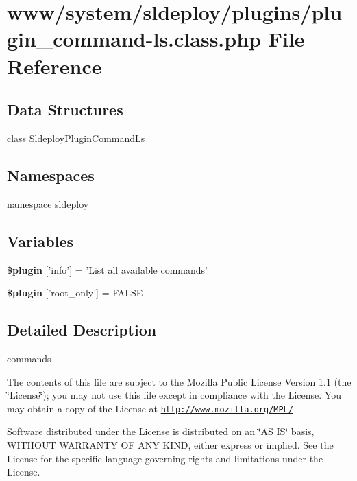 \hypertarget{plugin__command-ls_8class_8php}{
\section{www/system/sldeploy/plugins/plugin\_\-command-\/ls.class.php File Reference}
\label{plugin__command-ls_8class_8php}
}
\subsection*{Data Structures}
\begin{DoxyCompactItemize}
\item 
class \hyperlink{class_sldeploy_plugin_command_ls}{SldeployPluginCommandLs}
\end{DoxyCompactItemize}
\subsection*{Namespaces}
\begin{DoxyCompactItemize}
\item 
namespace \hyperlink{namespacesldeploy}{sldeploy}
\end{DoxyCompactItemize}
\subsection*{Variables}
\begin{DoxyCompactItemize}
\item 
\hypertarget{plugin__command-ls_8class_8php_a95edf69ebbeaeedb03bab3bb010f2af9}{
{\bfseries \$plugin} \mbox{[}'info'\mbox{]} = 'List all available commands'}
\label{plugin__command-ls_8class_8php_a95edf69ebbeaeedb03bab3bb010f2af9}

\item 
\hypertarget{plugin__command-ls_8class_8php_a1d302084fa15e3efe6c843cbb5096985}{
{\bfseries \$plugin} \mbox{[}'root\_\-only'\mbox{]} = FALSE}
\label{plugin__command-ls_8class_8php_a1d302084fa15e3efe6c843cbb5096985}

\end{DoxyCompactItemize}


\subsection{Detailed Description}
commands

The contents of this file are subject to the Mozilla Public License Version 1.1 (the \char`\"{}License\char`\"{}); you may not use this file except in compliance with the License. You may obtain a copy of the License at \href{http://www.mozilla.org/MPL/}{\tt http://www.mozilla.org/MPL/}

Software distributed under the License is distributed on an \char`\"{}AS IS\char`\"{} basis, WITHOUT WARRANTY OF ANY KIND, either express or implied. See the License for the specific language governing rights and limitations under the License. 